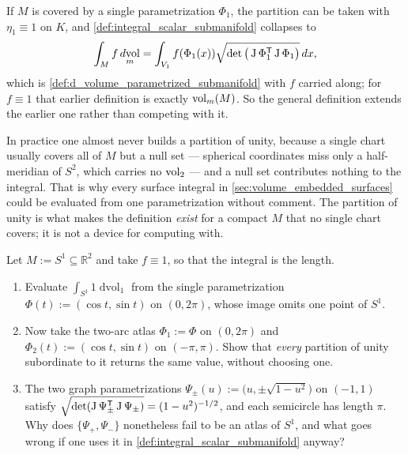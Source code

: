 \begin{remark}
\label{rem:one_chart_recovers_the_earlier_definition}
If $M$ is covered by a single parametrization $\Phi_1$, the partition can be taken with
$\eta_1 \equiv 1$ on $K$, and \cref{def:integral_scalar_submanifold} collapses to
\[\int_M f \mathop{d\text{vol}}_m
  = \int_{V_1} f(\Phi_1(x))\sqrt{\det\big(\operatorname{J}\Phi_1^{\mathsf{T}}\operatorname{J}\Phi_1\big)}\,dx ,\]
which is \cref{def:d_volume_parametrized_submanifold} with $f$ carried along; for $f \equiv 1$
that earlier definition is exactly $\operatorname{vol}_m(M)$. So the general definition extends the earlier one
rather than competing with it.

In practice one almost never builds a partition of unity, because a single chart usually covers
all of $M$ but a null set --- spherical coordinates miss only a half-meridian of $S^2$, which
carries no $\operatorname{vol}_2$ --- and a null set contributes nothing to the integral. That is why every
surface integral in \cref{sec:volume_embedded_surfaces} could be evaluated from one
parametrization without comment. The partition of unity is what makes the definition \emph{exist}
for a compact $M$ that no single chart covers; it is not a device for computing with.
\end{remark}

\begin{aiexercise}
\label{ex:ai_circle_two_atlases}
Let $M := S^1 \subseteq \mathbb{R}^2$ and take $f \equiv 1$, so that the integral is the length.
\begin{enumerate}[label=\textbf{(\alph*)}]
  \item Evaluate $\int_{S^1} 1 \mathop{d\text{vol}}_1$ from the single parametrization
    $\Phi(t) := (\cos t,\sin t)$ on $(0,2\pi)$, whose image omits one point of $S^1$.
  \item Now take the two-arc atlas $\Phi_1 := \Phi$ on $(0,2\pi)$ and $\Phi_2(t) :=
    (\cos t,\sin t)$ on $(-\pi,\pi)$. Show that \emph{every} partition of unity subordinate to it
    returns the same value, without choosing one.
  \item The two graph parametrizations $\Psi_\pm(u) := \big(u,\pm\sqrt{1-u^2}\big)$ on $(-1,1)$
    satisfy $\sqrt{\det(\operatorname{J}\Psi_\pm^{\mathsf{T}}\operatorname{J}\Psi_\pm)} = (1-u^2)^{-1/2}$, and each semicircle
    has length $\pi$. Why does $\{\Psi_+,\Psi_-\}$ nonetheless fail to be an atlas of $S^1$, and
    what goes wrong if one uses it in \cref{def:integral_scalar_submanifold} anyway?
\end{enumerate}
\end{aiexercise}
